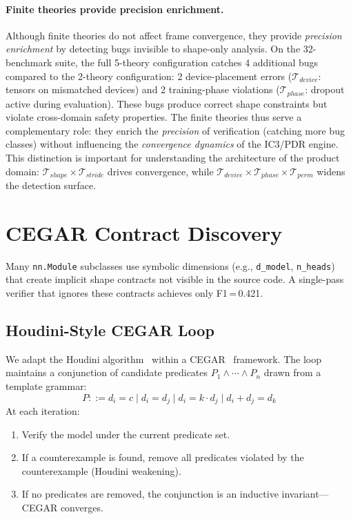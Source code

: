 \documentclass[11pt]{article}
\begin{document}
\paragraph{Finite theories provide precision enrichment.}
Although finite theories do not affect frame convergence, they
provide \emph{precision enrichment} by detecting bugs invisible to
shape-only analysis.  On the 32-benchmark suite, the full 5-theory
configuration catches 4 additional bugs compared to the 2-theory
configuration: 2 device-placement errors
($\mathcal{T}_{\mathit{device}}$: tensors on mismatched devices)
and 2 training-phase violations ($\mathcal{T}_{\mathit{phase}}$:
dropout active during evaluation).  These bugs produce correct
shape constraints but violate cross-domain safety properties.
The finite theories thus serve a complementary role: they enrich
the \emph{precision} of verification (catching more bug classes)
without influencing the \emph{convergence dynamics} of the IC3/PDR
engine.  This distinction is important for understanding the
architecture of the product domain: $\mathcal{T}_{\mathit{shape}}
\times \mathcal{T}_{\mathit{stride}}$ drives convergence, while
$\mathcal{T}_{\mathit{device}} \times \mathcal{T}_{\mathit{phase}}
\times \mathcal{T}_{\mathit{perm}}$ widens the detection surface.


\section{CEGAR Contract Discovery}\label{sec:cegar}

Many \texttt{nn.Module} subclasses use symbolic dimensions
(e.g., \texttt{d\_model}, \texttt{n\_heads}) that create implicit
shape contracts not visible in the source code.  A single-pass
verifier that ignores these contracts achieves only F1\,=\,0.421.

\subsection{Houdini-Style CEGAR Loop}

We adapt the Houdini algorithm~\cite{flanagan01} within a
CEGAR~\cite{clarke00} framework.  The loop maintains a
conjunction of candidate predicates $P_1 \land \cdots \land P_n$
drawn from a template grammar:
\[
  P ::= d_i = c \mid d_i = d_j \mid d_i = k \cdot d_j
        \mid d_i + d_j = d_k
\]
At each iteration:
\begin{enumerate}[leftmargin=2em]
  \item Verify the model under the current predicate set.
  \item If a counterexample is found, remove all predicates
    violated by the counterexample (Houdini weakening).
  \item If no predicates are removed, the conjunction is
    an inductive invariant---CEGAR converges.
\end{enumerate}
\end{document}
